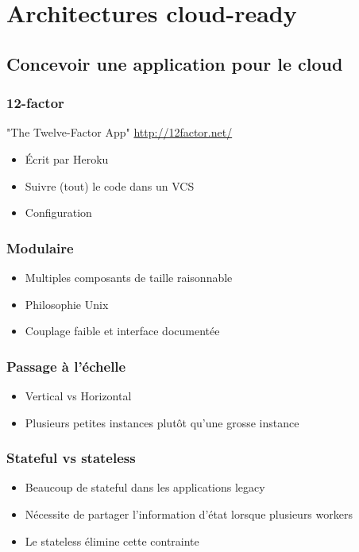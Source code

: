   \section[Architectures cloud]{Architectures cloud-ready}

  \subsection[Architecture dev]{Concevoir une application pour le cloud}

  \begin{frame}
    \frametitle{12-factor}
    "The Twelve-Factor App" \url{http://12factor.net/}
    \begin{itemize}
      \item Écrit par Heroku
      \item Suivre (tout) le code dans un VCS
      \item Configuration
    \end{itemize}
  \end{frame}

  \begin{frame}
    \frametitle{Modulaire}
    \begin{itemize}
      \item Multiples composants de taille raisonnable
      \item Philosophie Unix
      \item Couplage faible et interface documentée
    \end{itemize}
  \end{frame}

  \begin{frame}
    \frametitle{Passage à l'échelle}
    \begin{itemize}
      \item Vertical vs Horizontal
      \item Plusieurs petites instances plutôt qu'une grosse instance
    \end{itemize}
  \end{frame}

  \begin{frame}
    \frametitle{Stateful vs stateless}
    \begin{itemize}
      \item Beaucoup de stateful dans les applications legacy
      \item Nécessite de partager l'information d'état lorsque plusieurs workers
      \item Le stateless élimine cette contrainte
    \end{itemize}
  \end{frame}

